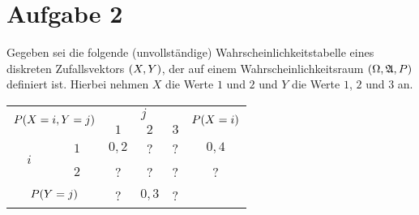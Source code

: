 \documentclass{exercise}
\begin{document}
    \section*{Aufgabe 2}
    
    \begin{problem}
        Gegeben sei die folgende (unvollständige) Wahrscheinlichkeitstabelle eines diskreten Zufallsvektors \(\parentheses*{X, Y}\), der auf einem Wahrscheinlichkeitsraum \(\parentheses*{\Omega, \mathfrak{A}, P}\) definiert ist.
        Hierbei nehmen \(X\) die Werte \(1\) und \(2\) und \(Y\) die Werte \(1\), \(2\) und \(3\) an.
        \begin{center}
            \begin{tabular}{cc|ccc|c}
                \toprule
                \multicolumn{2}{c|}{\multirow{2}{*}{\(P\parentheses*{X = i, Y = j}\)}} & \multicolumn{3}{c|}{\(j\)} & \multirow{2}{*}{\(P\parentheses*{X = i}\)}\\
                \multicolumn{2}{c|}{} & \(1\) & \(2\) & \(3\) &\\
                \midrule
                \multirow{2}{*}{\(i\)} & \(1\) & \(0,2\) & ? & ? & \(0,4\)\\
                & \(2\) & ? & ? & ? & ?\\
                \midrule
                \multicolumn{2}{c|}{\(P\parentheses*{Y = j}\)} & ? & \(0,3\) & ? &\\
                \bottomrule
            \end{tabular}
        \end{center}
    \end{problem}
    
\end{document}
